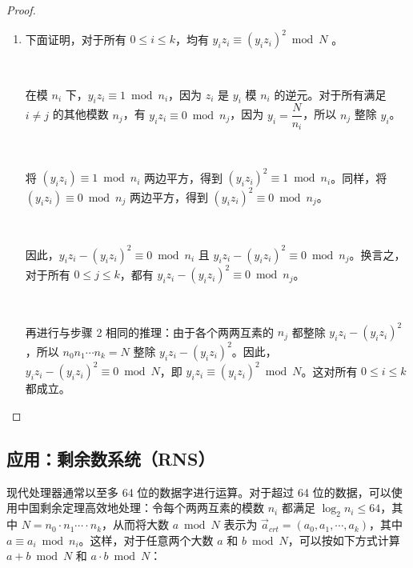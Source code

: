 \begin{proof}
\begin{enumerate}
\item 下面证明，对于所有 $0 \leq i \leq k$，均有 $y_iz_i \equiv (y_iz_i)^2 \bmod N$ \text{ }。

$ $

在模 $n_i$ 下，$y_iz_i \equiv 1 \bmod n_i$，因为 $z_i$ 是 $y_i$ 模 $n_i$ 的逆元。对于所有满足 $i \neq j$ 的其他模数 $n_j$，有 $y_iz_i \equiv 0 \bmod n_j$，因为 $y_i = \dfrac{N}{n_i}$，所以 $n_j$ 整除 $y_i$。

$ $

将 $(y_iz_i) \equiv 1 \bmod n_i$ 两边平方，得到 $(y_iz_i)^2 \equiv 1 \bmod n_i$。同样，将 $(y_iz_i) \equiv 0 \bmod n_j$ 两边平方，得到 $(y_iz_i)^2 \equiv 0 \bmod n_j$。

$ $

因此，$y_iz_i - (y_iz_i)^2 \equiv 0 \bmod n_i$ 且 $y_iz_i - (y_iz_i)^2 \equiv 0 \bmod n_j$。换言之，对于所有 $0 \leq j \leq k$，都有 $y_iz_i - (y_iz_i)^2 \equiv 0 \bmod n_j$。

$ $

再进行与步骤 2 相同的推理：由于各个两两互素的 $n_j$ 都整除 $y_iz_i - (y_iz_i)^2$，所以 $n_0n_1\cdots n_k = N$ 整除 $y_iz_i - (y_iz_i)^2$。因此，$y_iz_i - (y_iz_i)^2 \equiv 0 \bmod N$，即 $y_iz_i \equiv (y_iz_i)^2 \bmod N$。这对所有 $0 \leq i \leq k$ 都成立。

\end{enumerate}

\end{proof}


\subsection{应用：剩余数系统（RNS）}
\label{subsec:crt-application}

现代处理器通常以至多 64 位的数据字进行运算。对于超过 64 位的数据，可以使用中国剩余定理高效地处理：令每个两两互素的模数 $n_i$ 都满足 $\log_2n_i \leq 64$，其中 $N = n_0\cdot n_1\cdots\cdot n_k$，从而将大数 $a \bmod N$ 表示为 $\vec{a}_{\mathit{crt}} = (a_0, a_1, \cdots , a_k)$，其中 $a \equiv a_i \bmod n_i$。这样，对于任意两个大数 $a$ 和 $b \bmod N$，可以按如下方式计算 $a + b \bmod N$ 和 $a \cdot b \bmod N$：

